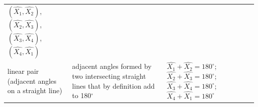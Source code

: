 {\begin{tabular}[t]{|l|l|l|}
        \begin{math}\left(\hat{{X}_{1}},\hat{{X}_{2}}\right)\end{math}, \begin{math}\left(\hat{{X}_{2}},\hat{{X}_{3}}\right)\end{math}, \begin{math}\left(\hat{{X}_{3}},\hat{{X}_{4}}\right)\end{math}, \begin{math}\left(\hat{{X}_{4}},\hat{{X}_{1}}\right)\end{math}%
     \tabularnewline\cline{1-1}\cline{2-2}\cline{3-3}
    
    
        linear pair (adjacent angles on a straight line) &
    
    
        adjacent angles formed by two intersecting straight lines that by definition add to 180\begin{math}{}^{\circ }\end{math} &
    
    
        
                  \begin{math}\hat{{X}_{1}}+\hat{{X}_{2}}={180}^{\circ }\end{math};
                  \begin{math}\hat{{X}_{2}}+\hat{{X}_{3}}={180}^{\circ }\end{math};
                  \begin{math}\hat{{X}_{3}}+\hat{{X}_{4}}={180}^{\circ }\end{math};
                  \begin{math}\hat{{X}_{4}}+\hat{{X}_{1}}={180}^{\circ }\end{math}
     \tabularnewline\cline{1-1}\cline{2-2}\cline{3-3}
    

\end{tabular}}
